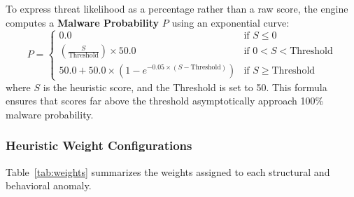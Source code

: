 \documentclass[11pt,a4paper]{article}
\begin{document}
To express threat likelihood as a percentage rather than a raw score, the engine computes a \textbf{Malware Probability} $P$ using an exponential curve:
\begin{equation}
    P = 
    \begin{cases} 
      0.0 & \text{if } S \le 0 \\
      \left(\frac{S}{\text{Threshold}}\right) \times 50.0 & \text{if } 0 < S < \text{Threshold} \\
      50.0 + 50.0 \times \left(1 - e^{-0.05 \times (S - \text{Threshold})}\right) & \text{if } S \ge \text{Threshold}
   \end{cases}
\end{equation}
where $S$ is the heuristic score, and the Threshold is set to 50. This formula ensures that scores far above the threshold asymptotically approach 100\% malware probability.

\subsubsection{Heuristic Weight Configurations}
Table~\ref{tab:weights} summarizes the weights assigned to each structural and behavioral anomaly.
\end{document}
